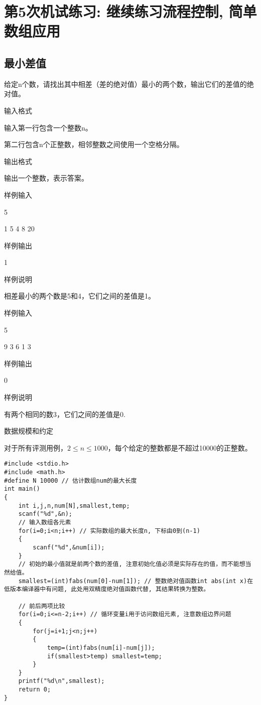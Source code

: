 %
%
%
\chapter{第5次机试练习:  继续练习流程控制, 简单数组应用}

\section{最小差值}
给定n个数，请找出其中相差（差的绝对值）最小的两个数，输出它们的差值的绝对值。

输入格式

输入第一行包含一个整数n。

第二行包含n个正整数，相邻整数之间使用一个空格分隔。

输出格式

输出一个整数，表示答案。

样例输入

5

1 5 4 8 20

样例输出

1

样例说明

相差最小的两个数是5和4，它们之间的差值是1。

样例输入

5

9 3 6 1 3

样例输出

0

样例说明

有两个相同的数3，它们之间的差值是0.

数据规模和约定

对于所有评测用例，$2\le n\le1000$，每个给定的整数都是不超过10000的正整数。

\begin{lstlisting}
#include <stdio.h>
#include <math.h>
#define N 10000 // 估计数组num的最大长度 
int main()
{
	int i,j,n,num[N],smallest,temp; 
	scanf("%d",&n);
	// 输入数组各元素
	for(i=0;i<n;i++) // 实际数组的最大长度n, 下标由0到(n-1)
	{
		scanf("%d",&num[i]);
	}
	// 初始的最小值就是前两个数的差值, 注意初始化值必须是实际存在的值，而不能想当然给值。
	smallest=(int)fabs(num[0]-num[1]); // 整数绝对值函数int abs(int x)在低版本编译器中有问题, 此处用双精度绝对值函数代替, 其结果转换为整数。  
	
	// 前后两项比较
	for(i=0;i<=n-2;i++) // 循环变量i用于访问数组元素, 注意数组边界问题
	{
		for(j=i+1;j<n;j++)
		{
			temp=(int)fabs(num[i]-num[j]);
			if(smallest>temp) smallest=temp;
		}
	}
	printf("%d\n",smallest);
	return 0;
} 
\end{lstlisting}


